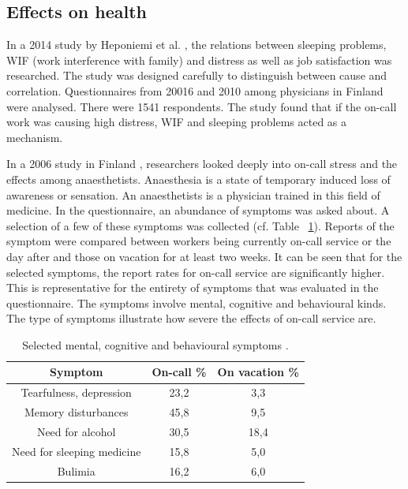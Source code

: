 \documentclass{CML_Seminar_Template}
\begin{document}
\subsection{Effects on health}
In a 2014 study by Heponiemi et al. \cite[]{heponiemi2014call}, the relations between sleeping problems, WIF (work interference with family) and distress as well as job satisfaction was researched. The study was designed carefully to distinguish between cause and correlation. Questionnaires from 20016 and 2010 among physicians in Finland were analysed. There were 1541 respondents. The study found that if the on-call work was causing high distress, WIF and sleeping problems acted as a mechanism.
\par
In a 2006 study in Finland \cite[]{Lindfors2006}, researchers looked deeply into on-call stress and the effects among anaesthetists. Anaesthesia is a state of temporary induced loss of awareness or sensation. An anaesthetists is a physician trained in this field of medicine. In the questionnaire, an abundance of symptoms was asked about. A selection of a few of these symptoms was collected (cf. Table ~\ref{CML_Seminar_Template_tab1}). Reports of the symptom were compared between workers being currently on-call service or the day after and those on vacation for at least two weeks. It can be seen that for the selected symptoms, the report rates for on-call service are significantly higher. This is representative for the entirety of symptoms that was evaluated in the questionnaire. The symptoms involve mental, cognitive and behavioural kinds. The type of symptoms illustrate how severe the effects of on-call service are.


\begin{table}
\begin{center}
\begin{tabular}{ |c|c|c|} 
 \hline
 Symptom & On-call \% & On vacation \% \\
 \hline
 Tearfulness, depression & 23,2 & 3,3 \\
 \hline
 Memory disturbances & 45,8 & 9,5 \\
 \hline
 Need for alcohol & 30,5 & 18,4 \\
 \hline
 Need for sleeping medicine & 15,8 & 5,0 \\
 \hline
 Bulimia & 16,2 & 6,0 \\
 \hline
\end{tabular}
\end{center}
    \caption{\label{CML_Seminar_Template_tab1} Selected mental, cognitive and behavioural symptoms \cite[]{Lindfors2006}. }
\end{table}
\end{document}
